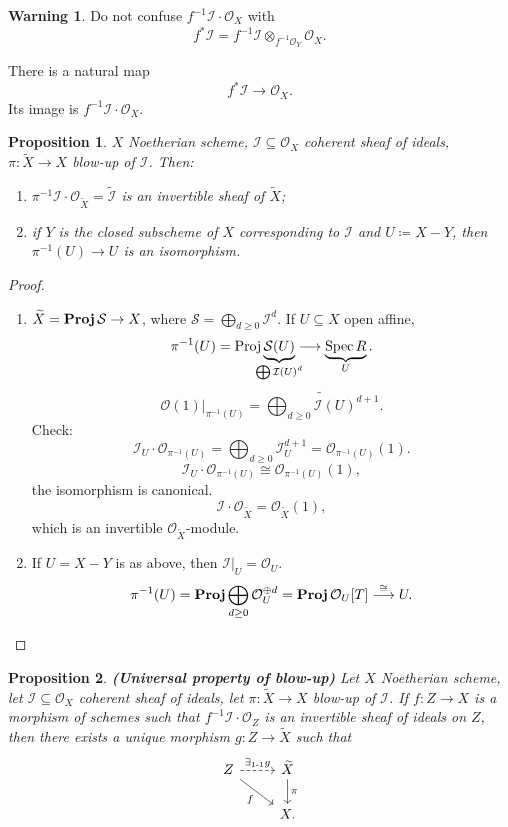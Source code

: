 \documentclass[12pt]{article}
\DeclareMathOperator{\Spec}{Spec}
\DeclareMathOperator{\Proj}{Proj}
\DeclareMathOperator{\relProj}{\textnormal{\textbf{Proj}}}
\newtheorem*{proposition}{Proposition}
\theoremstyle{definition}
\newtheorem*{warning}{Warning}
\theoremstyle{remark}
\begin{document}
\begin{warning}
Do not confuse $f^{-1}\mathcal{I}\cdot\mathcal{O}_X$ with
\[f^*\mathcal{I}=f^{-1}\mathcal{I}\otimes_{f^{-1}\mathcal{O}_Y}\mathcal{O}_X.\]

There is a natural map
\[f^*\mathcal{I}\longrightarrow\mathcal{O}_X.\]
Its image is $f^{-1}\mathcal{I}\cdot\mathcal{O}_X$.
\end{warning}

\begin{proposition}
$X$ Noetherian scheme, $\mathcal{I}\subseteq\mathcal{O}_X$ coherent sheaf of ideals, $\pi:\widetilde{X}\rightarrow X$ blow-up of $\mathcal{I}$. Then:
\begin{enumerate}[label=\arabic*)]
\item $\pi^{-1}\mathcal{I}\cdot\mathcal{O}_{\widetilde{X}}=\widetilde{\mathcal{I}}$ is an invertible sheaf of $\widetilde{X}$;
\item if $Y$ is the closed subscheme of $X$ corresponding to $\mathcal{I}$ and $U\coloneqq X-Y$, then $\pi^{-1}(U)\rightarrow U$ is an isomorphism.
\end{enumerate}
\end{proposition}

\begin{proof}
\begin{enumerate}[label=\arabic*)]
\item $\widetilde{X}=\relProj\mathcal{S}\rightarrow X$, where $\mathcal{S}=\bigoplus_{d\geq0}\mathcal{I}^d$. If $U\subseteq X$ open affine,
\[\pi^{-1}(U)=\Proj\underbrace{\mathcal{S}(U)}_{\mathclap{\bigoplus\mathcal{I}(U)^d}}\longrightarrow\underbrace{\Spec R}_U.\]
\[\mathcal{O}(1)|_{\pi^{-1}(U)}=\widetilde{\bigoplus_{d\geq0}\mathcal{I}(U)^{d+1}}.\]
Check:
\[\mathcal{I}_U\cdot\mathcal{O}_{\pi^{-1}(U)}=\bigoplus_{d\geq0}\mathcal{I}_U^{d+1}=\mathcal{O}_{\pi^{-1}(U)}(1).\]
\[\mathcal{I}_U\cdot\mathcal{O}_{\pi^{-1}(U)}\cong\mathcal{O}_{\pi^{-1}(U)}(1),\]
the isomorphism is canonical.
\[\mathcal{I}\cdot\mathcal{O}_{\widetilde{X}}=\mathcal{O}_{\widetilde{X}}(1),\]
which is an invertible $\mathcal{O}_{\widetilde{X}}$-module.

\item If $U=X-Y$ is as above, then $\mathcal{I}|_U=\mathcal{O}_U$.
\[\pi^{-1}(U)=\relProj\bigoplus_{d\geq0}\mathcal{O}_U^{\oplus d}=\relProj\mathcal{O}_U[T]\overset{\cong}{\longrightarrow}U.\]
\end{enumerate}
\end{proof}

\begin{proposition}
\emph{\textbf{(Universal property of blow-up)}} Let $X$ Noetherian scheme, let $\mathcal{I}\subseteq\mathcal{O}_X$ coherent sheaf of ideals, let $\pi:\widetilde{X}\rightarrow X$ blow-up of $\mathcal{I}$. If $f:Z\rightarrow X$ is a morphism of schemes such that $f^{-1}\mathcal{I}\cdot\mathcal{O}_Z$ is an invertible sheaf of ideals on $Z$, then there exists a unique morphism $g:Z\rightarrow\widetilde{X}$ such that
\[
\begin{tikzcd}
Z\arrow[r,dashed,"\exists_{1\text{-}1}g"]\arrow[rd,"f",swap]&\widetilde{X}\arrow[d,"\pi"]\\
&X.
\end{tikzcd}
\]
\end{proposition}
\end{document}
